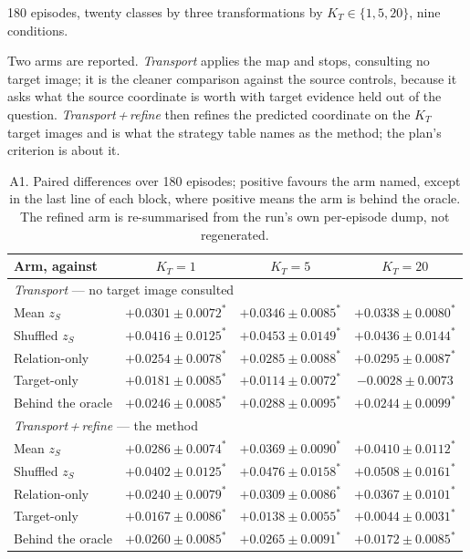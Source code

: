 \documentclass{article}
\begin{document}
180 episodes, twenty classes by three transformations by $K_T \in \{1,5,20\}$, nine
conditions.

Two arms are reported. \emph{Transport} applies the map and stops, consulting no target
image; it is the cleaner comparison against the source controls, because it asks what the
source coordinate is worth with target evidence held out of the question.
\emph{Transport\,+\,refine} then refines the predicted coordinate on the $K_T$ target images
and is what the strategy table names as the method; the plan's criterion is about it.

\begin{table}[h]
\centering
\small
\begin{tabular}{lccc}
\toprule
Arm, against & $K_T=1$ & $K_T=5$ & $K_T=20$\\
\midrule
\multicolumn{4}{l}{\emph{Transport} --- no target image consulted}\\
\quad Mean $z_S$ & $+0.0301 \pm 0.0072^{*}$ & $+0.0346 \pm 0.0085^{*}$ & $+0.0338 \pm 0.0080^{*}$\\
\quad Shuffled $z_S$ & $+0.0416 \pm 0.0125^{*}$ & $+0.0453 \pm 0.0149^{*}$ & $+0.0436 \pm 0.0144^{*}$\\
\quad Relation-only & $+0.0254 \pm 0.0078^{*}$ & $+0.0285 \pm 0.0088^{*}$ & $+0.0295 \pm 0.0087^{*}$\\
\quad Target-only & $+0.0181 \pm 0.0085^{*}$ & $+0.0114 \pm 0.0072^{*}$ & $-0.0028 \pm 0.0073$\\
\quad Behind the oracle & $+0.0246 \pm 0.0085^{*}$ & $+0.0288 \pm 0.0095^{*}$ & $+0.0244 \pm 0.0099^{*}$\\
\midrule
\multicolumn{4}{l}{\emph{Transport\,+\,refine} --- the method}\\
\quad Mean $z_S$ & $+0.0286 \pm 0.0074^{*}$ & $+0.0369 \pm 0.0090^{*}$ & $+0.0410 \pm 0.0112^{*}$\\
\quad Shuffled $z_S$ & $+0.0402 \pm 0.0125^{*}$ & $+0.0476 \pm 0.0158^{*}$ & $+0.0508 \pm 0.0161^{*}$\\
\quad Relation-only & $+0.0240 \pm 0.0079^{*}$ & $+0.0309 \pm 0.0086^{*}$ & $+0.0367 \pm 0.0101^{*}$\\
\quad Target-only & $+0.0167 \pm 0.0086^{*}$ & $+0.0138 \pm 0.0055^{*}$ & $+0.0044 \pm 0.0031^{*}$\\
\quad Behind the oracle & $+0.0260 \pm 0.0085^{*}$ & $+0.0265 \pm 0.0091^{*}$ & $+0.0172 \pm 0.0085^{*}$\\
\bottomrule
\end{tabular}
\caption{A1. Paired differences over 180 episodes; positive favours the arm named, except
in the last line of each block, where positive means the arm is behind the oracle. The
refined arm is re-summarised from the run's own per-episode dump, not regenerated.}
\end{table}
\end{document}
